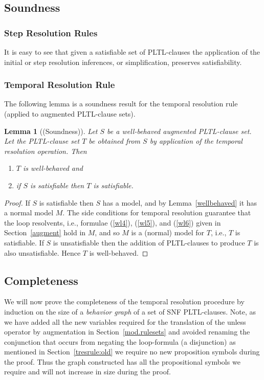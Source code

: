 \documentclass[nohyperref]{acmtrans2f}
\newtheorem{sublemma}{Lemma}[subsection]
\begin{document}
\vspace{1ex}

\subsection{Soundness}
\label{sound.sect}

\subsubsection{Step Resolution Rules}
It is easy to see that given a satisfiable set of PLTL-clauses the application of
the initial or step resolution inferences, or simplification, preserves
satisfiability. 
%
\subsubsection{Temporal Resolution Rule}
%
The following lemma is a soundness result for the temporal resolution rule
(applied to augmented PLTL-clause sets).

\begin{sublemma}[(Soundness)]
\label{sound}
Let $S$ be a well-behaved augmented PLTL-clause set. Let the PLTL-clause set $T$ be
obtained from $S$ by application of the temporal resolution operation. Then
\begin{enumerate}
\item $T$ is well-behaved and
\item if $S$ is satisfiable then $T$ is satisfiable.
\end{enumerate}
\end{sublemma}

\begin{proof}
If $S$ is satisfiable then $S$ has a model, and by Lemma~\ref{wellbehaved}
it has a normal model $M$. The side 
conditions for temporal resolution guarantee that the loop resolvents, i.e.,
formulae
(\ref{wl4}), (\ref{wl5}), and (\ref{wl6}) given in Section~\ref{augment} hold
in $M$, and so $M$ 
is a (normal) model for $T$, i.e., $T$ is satisfiable.  
If $S$ is unsatisfiable then the addition of PLTL-clauses to produce $T$ is
also unsatisfiable. Hence $T$ is well-behaved.
\end{proof}


\subsection{Completeness}
\label{complete.sect}
%
We will now prove the completeness of the temporal resolution
procedure by induction on the size of a {\em behavior graph} of a set
of SNF PLTL-clauses. Note, as we have added all the new variables
required for the translation of the unless operator by augmentation in
Section~\ref{mod.rulesets} and avoided renaming the conjunction that
occurs from negating the loop-formula (a disjunction) as mentioned in
Section~\ref{tresrule:old} we require no new proposition symbols during the
proof. Thus the graph constructed has all the propositional symbols we
require and will not increase in size during the proof.
\end{document}
